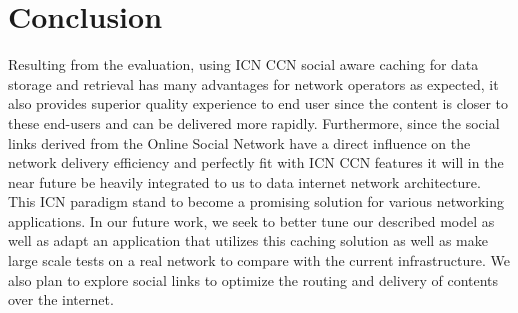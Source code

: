 \chapter{Conclusion}

Resulting from the evaluation, using ICN CCN social aware caching for data storage and retrieval has many advantages for network operators as expected, it also provides superior quality experience to end user since the content is closer to these end-users and can be delivered more rapidly. Furthermore, since the social links derived from the Online Social Network have a direct influence on the network delivery efficiency and perfectly fit with ICN CCN features it will in the near future be heavily integrated to us to data internet network architecture. 
This ICN paradigm stand to become a promising solution for various networking applications. In our future work, we seek to better tune our described model as well as adapt an application that utilizes this caching solution as well as make large scale tests on a real network to compare with the current infrastructure. We also plan to explore social links to optimize the routing and delivery of contents over the internet. 



